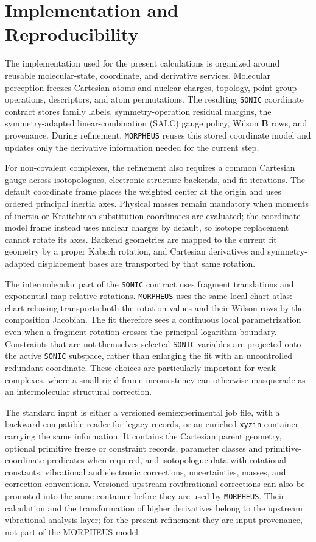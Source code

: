 \documentclass[aip,jcp,reprint,longbibliography,floatfix]{revtex4-2}
\begin{document}
\section{Implementation and Reproducibility}

The implementation used for the present calculations is organized around
reusable molecular-state, coordinate, and derivative services. Molecular
perception freezes Cartesian atoms and nuclear charges, topology, point-group
operations, descriptors, and atom permutations. The resulting
\texttt{SONIC} coordinate contract stores family labels,
symmetry-operation residual margins, the symmetry-adapted linear-combination
(SALC) gauge policy, Wilson
$\mathbf{B}$ rows, and provenance. During refinement, \texttt{MORPHEUS}
reuses this stored coordinate model and updates only the derivative
information needed for the current step.

For non-covalent complexes, the refinement also requires a common Cartesian
gauge across isotopologues, electronic-structure backends, and fit iterations.
The default coordinate frame places the weighted center at the origin and uses
ordered principal inertia axes.  Physical masses remain mandatory when moments
of inertia or Kraitchman substitution coordinates are evaluated; the
coordinate-model frame instead uses nuclear charges by default, so isotope
replacement cannot rotate its axes.  Backend geometries are mapped to the
current fit geometry by a proper Kabsch rotation, and Cartesian derivatives and
symmetry-adapted displacement bases are transported by that same rotation.

The intermolecular part of the \texttt{SONIC} contract uses fragment
translations and exponential-map relative rotations.  \texttt{MORPHEUS}
uses the same local-chart atlas: chart rebasing transports both the
rotation values and their Wilson rows by the composition Jacobian.  The fit
therefore sees a continuous local parametrization even when a fragment
rotation crosses the principal logarithm boundary.  Constraints that are not
themselves selected \texttt{SONIC} variables are projected onto the active
\texttt{SONIC} subspace, rather than enlarging the fit with an uncontrolled
redundant coordinate.  These choices are particularly important for weak
complexes, where a small rigid-frame inconsistency can otherwise masquerade as
an intermolecular structural correction.

The standard input is either a versioned semiexperimental job file, with a
backward-compatible reader for legacy records, or an enriched \texttt{xyzin}
container carrying the same information. It contains the Cartesian parent
geometry, optional primitive freeze or constraint records, parameter classes
and primitive-coordinate predicates when required, and isotopologue data with
rotational constants, vibrational and electronic corrections, uncertainties,
masses, and correction conventions. Versioned upstream rovibrational
corrections can also be promoted into the same container before they are used
by \texttt{MORPHEUS}. Their calculation and the transformation of higher
derivatives belong to the upstream vibrational-analysis layer; for the present
refinement they are input provenance, not part of the MORPHEUS model.
\end{document}
